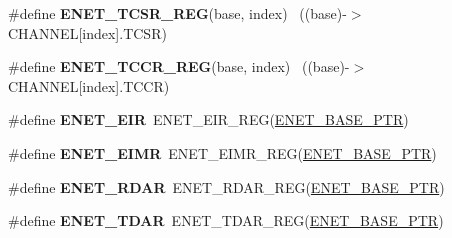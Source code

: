 \begin{DoxyCompactItemize}
\item 
\hypertarget{group___e_n_e_t___register___accessor___macros_gaa967beb0259ccd0dcf8b01801f55990d}{}\#define {\bfseries E\+N\+E\+T\+\_\+\+T\+C\+S\+R\+\_\+\+R\+E\+G}(base,  index)                            ~((base)-\/$>$C\+H\+A\+N\+N\+E\+L\mbox{[}index\mbox{]}.T\+C\+S\+R)\label{group___e_n_e_t___register___accessor___macros_gaa967beb0259ccd0dcf8b01801f55990d}

\item 
\hypertarget{group___e_n_e_t___register___accessor___macros_ga3ddd5dd730fc50666ef061f959b71130}{}\#define {\bfseries E\+N\+E\+T\+\_\+\+T\+C\+C\+R\+\_\+\+R\+E\+G}(base,  index)                            ~((base)-\/$>$C\+H\+A\+N\+N\+E\+L\mbox{[}index\mbox{]}.T\+C\+C\+R)\label{group___e_n_e_t___register___accessor___macros_ga3ddd5dd730fc50666ef061f959b71130}

\item 
\hypertarget{group___e_n_e_t___register___accessor___macros_ga4bbc86df12f271cea45cda0f6384d344}{}\#define {\bfseries E\+N\+E\+T\+\_\+\+E\+I\+R}~E\+N\+E\+T\+\_\+\+E\+I\+R\+\_\+\+R\+E\+G(\hyperlink{group___e_n_e_t___peripheral_gab64a2d991cc2bd76dd55ee25a52dcb5c}{E\+N\+E\+T\+\_\+\+B\+A\+S\+E\+\_\+\+P\+T\+R})\label{group___e_n_e_t___register___accessor___macros_ga4bbc86df12f271cea45cda0f6384d344}

\item 
\hypertarget{group___e_n_e_t___register___accessor___macros_ga10ea5798672d95d4d5b41e03bfa8575e}{}\#define {\bfseries E\+N\+E\+T\+\_\+\+E\+I\+M\+R}~E\+N\+E\+T\+\_\+\+E\+I\+M\+R\+\_\+\+R\+E\+G(\hyperlink{group___e_n_e_t___peripheral_gab64a2d991cc2bd76dd55ee25a52dcb5c}{E\+N\+E\+T\+\_\+\+B\+A\+S\+E\+\_\+\+P\+T\+R})\label{group___e_n_e_t___register___accessor___macros_ga10ea5798672d95d4d5b41e03bfa8575e}

\item 
\hypertarget{group___e_n_e_t___register___accessor___macros_ga3527608cef8fbe6e0dc66fcc1dfb27b2}{}\#define {\bfseries E\+N\+E\+T\+\_\+\+R\+D\+A\+R}~E\+N\+E\+T\+\_\+\+R\+D\+A\+R\+\_\+\+R\+E\+G(\hyperlink{group___e_n_e_t___peripheral_gab64a2d991cc2bd76dd55ee25a52dcb5c}{E\+N\+E\+T\+\_\+\+B\+A\+S\+E\+\_\+\+P\+T\+R})\label{group___e_n_e_t___register___accessor___macros_ga3527608cef8fbe6e0dc66fcc1dfb27b2}

\item 
\hypertarget{group___e_n_e_t___register___accessor___macros_gae527e62ae40f914602970334ec655b8f}{}\#define {\bfseries E\+N\+E\+T\+\_\+\+T\+D\+A\+R}~E\+N\+E\+T\+\_\+\+T\+D\+A\+R\+\_\+\+R\+E\+G(\hyperlink{group___e_n_e_t___peripheral_gab64a2d991cc2bd76dd55ee25a52dcb5c}{E\+N\+E\+T\+\_\+\+B\+A\+S\+E\+\_\+\+P\+T\+R})\label{group___e_n_e_t___register___accessor___macros_gae527e62ae40f914602970334ec655b8f}


\end{DoxyCompactItemize}
